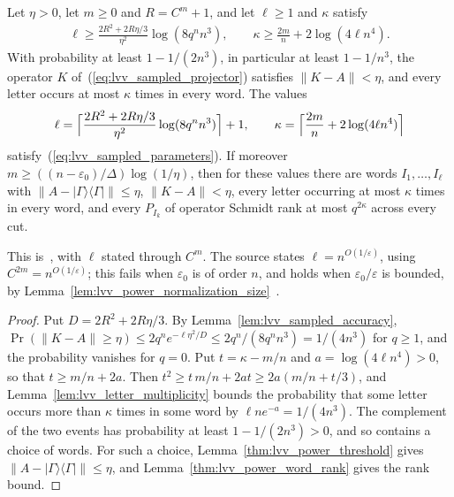 \begin{lemma}
    \label{thm:lvv_sampled_projector}
    \leanok
    Let $\eta>0$, let $m\ge0$ and $R=C^m+1$, and let $\ell\ge1$ and $\kappa$
    satisfy
    \begin{align}
        \ell\ge\frac{2R^2+2R\eta/3}{\eta^2}\log(8q^nn^3),\qquad
        \kappa\ge\frac{2m}n+2\log(4\ell n^4).
        \label{eq:lvv_sampled_parameters}
    \end{align}
    With probability at least $1-1/(2n^3)$, in particular at least $1-1/n^3$,
    the operator $K$ of~(\ref{eq:lvv_sampled_projector}) satisfies
    $\|K-A\|<\eta$, and every letter occurs at most $\kappa$ times in every word.
    The values
    \begin{align*}
        \ell=\Bigl\lceil\frac{2R^2+2R\eta/3}{\eta^2}\log(8q^nn^3)\Bigr\rceil+1,
        \qquad
        \kappa=\Bigl\lceil\frac{2m}n+2\log(4\ell n^4)\Bigr\rceil
    \end{align*}
    satisfy~(\ref{eq:lvv_sampled_parameters}). If moreover
    $m\ge((n-\varepsilon_0)/\Delta)\log(1/\eta)$, then for these values there are
    words $I_1,\ldots,I_\ell$ with $\|A-|\Gamma\rangle\langle\Gamma|\|\le\eta$,
    $\|K-A\|<\eta$, every letter occurring at most $\kappa$ times in every word,
    and every $P_{I_k}$ of operator Schmidt rank at most $q^{2\kappa}$ across
    every cut.

    This is~\cite[lines 626--649]{Landau2015Polynomial}, with $\ell$ stated
    through $C^m$. The source states $\ell=n^{O(1/\varepsilon)}$, using
    $C^{2m}=n^{O(1/\varepsilon)}$; this fails when $\varepsilon_0$ is of order
    $n$, and holds when $\varepsilon_0/\varepsilon$ is bounded, by
    Lemma~\ref{lem:lvv_power_normalization_size}~\cite{gap:lvv13_runtime_ground_energy}.
\end{lemma}

\begin{proof}
    \leanok
    Put $D=2R^2+2R\eta/3$. By Lemma~\ref{lem:lvv_sampled_accuracy},
    $\Pr(\|K-A\|\ge\eta)\le2q^ne^{-\ell\eta^2/D}\le2q^n/(8q^nn^3)=1/(4n^3)$ for
    $q\ge1$, and the probability vanishes for $q=0$. Put $t=\kappa-m/n$ and
    $a=\log(4\ell n^4)>0$, so that $t\ge m/n+2a$. Then
    $t^2\ge t\,m/n+2at\ge2a(m/n+t/3)$, and
    Lemma~\ref{lem:lvv_letter_multiplicity} bounds the probability that some
    letter occurs more than $\kappa$ times in some word by
    $\ell ne^{-a}=1/(4n^3)$. The complement of the two events has probability
    at least $1-1/(2n^3)>0$, and so contains a choice of words. For such a
    choice, Lemma~\ref{thm:lvv_power_threshold} gives
    $\|A-|\Gamma\rangle\langle\Gamma|\|\le\eta$, and
    Lemma~\ref{thm:lvv_power_word_rank} gives the rank bound.
\end{proof}

